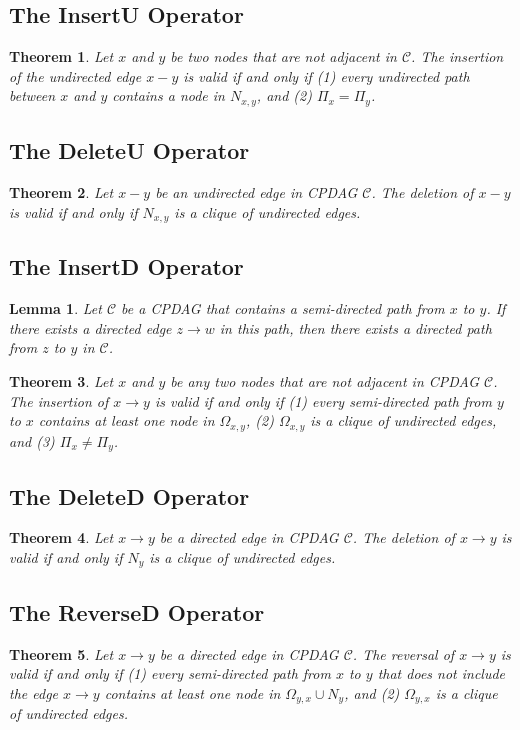 \documentclass{article}
\newtheorem{theorem}{Theorem}[section]
\newtheorem{lemma}{Lemma}[section]
\theoremstyle{definition}
\newcommand{\cC}{\mathcal{C}}
\newcommand{\<}{\left\langle}
\renewcommand{\>}{\right\rangle}
\begin{document}
\subsection{The InsertU Operator}
\begin{theorem}
    Let $x$ and $y$ be two nodes that are not adjacent in $\cC$. The insertion of the undirected edge $x - y$ is valid if and only if (1) every undirected path between $x$ and $y$ contains a node in $N_{x,y}$, and (2) $\Pi_x = \Pi_y$.
\end{theorem}

\subsection{The DeleteU Operator}
\begin{theorem}
    Let $x - y$ be an undirected edge in CPDAG $\cC$. The deletion of $x - y$ is valid if and only if $N_{x,y}$ is a clique of undirected edges.
\end{theorem}

\subsection{The InsertD Operator}
\begin{lemma}
    Let $\cC$ be a CPDAG that contains a semi-directed path from $x$ to $y$. If there exists a directed edge $z \rightarrow w$ in this path, then there exists a directed path from $z$ to $y$ in $\cC$.
\end{lemma}

\begin{theorem}
    Let $x$ and $y$ be any two nodes that are not adjacent in CPDAG $\cC$. The insertion of $x \rightarrow y$ is valid if and only if (1) every semi-directed path from $y$ to $x$ contains at least one node in $\Omega_{x,y}$, (2) $\Omega_{x,y}$ is a clique of undirected edges, and (3) $\Pi_x \ne \Pi_y$.
\end{theorem}

\subsection{The DeleteD Operator}
\begin{theorem}
    Let $x \rightarrow y$ be a directed edge in CPDAG $\cC$. The deletion of $x \rightarrow y$ is valid if and only if $N_y$ is a clique of undirected edges.
\end{theorem}

\subsection{The ReverseD Operator}
\begin{theorem}
    Let $x \rightarrow y$ be a directed edge in CPDAG $\cC$. The reversal of $x \rightarrow y$ is valid if and only if (1) every semi-directed path from $x$ to $y$ that does not include the edge $x \rightarrow y$ contains at least one node in $\Omega_{y,x} \cup N_y$, and (2) $\Omega_{y,x}$ is a clique of undirected edges.
\end{theorem}
\end{document}
